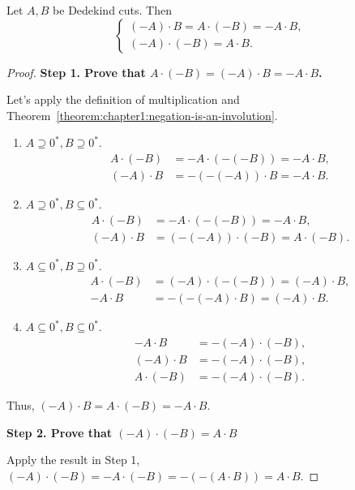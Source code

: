 \begin{theorem}\label{theorem:chapter1:multiplication-and-negation}
    Let $A, B$ be Dedekind cuts. Then
    \[
        \begin{cases}
            (-A)\cdot B = A\cdot (-B) = - A\cdot B, \\
            (-A)\cdot (-B) = A\cdot B.
        \end{cases}
    \]
\end{theorem}

\begin{proof}
    \noindent\textbf{Step 1. Prove that $A\cdot (-B) = (-A)\cdot B = -A\cdot B$.}

    Let's apply the definition of multiplication and Theorem~\ref{theorem:chapter1:negation-is-an-involution}.

    \begin{enumerate}[label={\textbf{Case \arabic*.}},itemsep=0pt,itemindent=0.5cm]
        \item $A\supseteq {0}^{*}, B\supseteq {0}^{*}$.
              \begin{align*}
                  A\cdot (-B) & = -A\cdot (-(-B)) = -A\cdot B, \\
                  (-A)\cdot B & = -(-(-A))\cdot B = -A\cdot B.
              \end{align*}
        \item $A\supseteq {0}^{*}, B\subseteq {0}^{*}$.
              \begin{align*}
                  A\cdot (-B) & = -A\cdot (-(-B)) = -A\cdot B,     \\
                  (-A)\cdot B & = (-(-A))\cdot (-B) = A\cdot (-B).
              \end{align*}
        \item $A\subseteq {0}^{*}, B\supseteq {0}^{*}$.
              \begin{align*}
                  A\cdot (-B) & = (-A)\cdot (-(-B)) = (-A)\cdot B, \\
                  -A\cdot B   & = -(-(-A)\cdot B) = (-A)\cdot B.
              \end{align*}
        \item $A\subseteq {0}^{*}, B\subseteq {0}^{*}$.
              \begin{align*}
                  -A\cdot B   & = -(-A)\cdot (-B), \\
                  (-A)\cdot B & = -(-A)\cdot (-B), \\
                  A\cdot (-B) & = -(-A)\cdot (-B).
              \end{align*}
    \end{enumerate}

    Thus, $(-A)\cdot B = A\cdot (-B) = -A\cdot B$.

    \noindent\textbf{Step 2. Prove that $(-A)\cdot (-B) = A\cdot B$}

    \noindent Apply the result in Step 1, $(-A)\cdot (-B) = -A\cdot (-B) = -(-(A\cdot B)) = A\cdot B$.
\end{proof}

